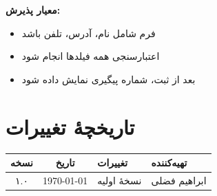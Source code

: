 \documentclass[12pt, a4paper]{article}
\begin{document}
\textbf{معیار پذیرش:}
\begin{itemize}
    \item فرم شامل نام، آدرس، تلفن باشد
    \item اعتبارسنجی همه فیلدها انجام شود
    \item بعد از ثبت، شماره پیگیری نمایش داده شود
\end{itemize}

\appendix
\section{تاریخچهٔ تغییرات}

\begin{center}
\begin{tabular}{|c|c|l|l|}
\hline
\textbf{نسخه} & \textbf{تاریخ} & \textbf{تغییرات} & \textbf{تهیه‌کننده} \\
\hline
۱.۰ & \today & نسخهٔ اولیه & ابراهیم فضلی \\
\hline
\end{tabular}
\end{center}
\end{document}

